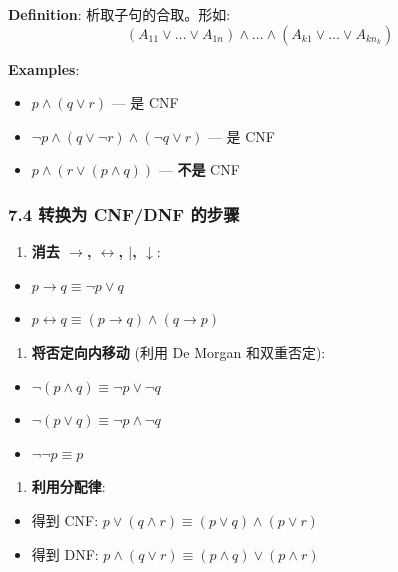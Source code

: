 \documentclass[10pt,a4paper,openany]{ctexbook}
\theoremstyle{definition}
\theoremstyle{remark}
\begin{document}
\textbf{Definition}: 析取子句的合取。形如:
\[
(A_{11} \lor \dots \lor A_{1n}) \land \dots \land (A_{k1} \lor \dots \lor A_{kn_k})
\]

\textbf{Examples}:
\begin{itemize}
\item $p \land (q \lor r)$ — 是 CNF
\item $\neg p \land (q \lor \neg r) \land (\neg q \lor r)$ — 是 CNF
\item $p \land (r \lor (p \land q))$ — \textbf{不是} CNF

\end{itemize}

\subsubsection{7.4 转换为 CNF/DNF 的步骤}

\begin{enumerate}
\item \textbf{消去 $\to$, $\leftrightarrow$, $|$, $\downarrow$}:
\end{enumerate}

\begin{itemize}
\item $p \to q \equiv \neg p \lor q$
\item $p \leftrightarrow q \equiv (p \to q) \land (q \to p)$
\end{itemize}

\begin{enumerate}
\item \textbf{将否定向内移动} (利用 De Morgan 和双重否定):
\end{enumerate}

\begin{itemize}
\item $\neg(p \land q) \equiv \neg p \lor \neg q$
\item $\neg(p \lor q) \equiv \neg p \land \neg q$
\item $\neg\neg p \equiv p$
\end{itemize}

\begin{enumerate}
\item \textbf{利用分配律}:
\end{enumerate}

\begin{itemize}
\item 得到 CNF: $p \lor (q \land r) \equiv (p \lor q) \land (p \lor r)$
\item 得到 DNF: $p \land (q \lor r) \equiv (p \land q) \lor (p \land r)$

\end{itemize}
\end{document}
